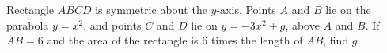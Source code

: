 Rectangle $ABCD$ is symmetric about the $y$-axis. Points $A$ and $B$ lie on the parabola $y=x^2$, and points $C$ and $D$ lie on $y=-3x^2+g$, above $A$ and $B$. If $AB=6$ and the area of the rectangle is $6$ times the length of $AB$, find $g$.
